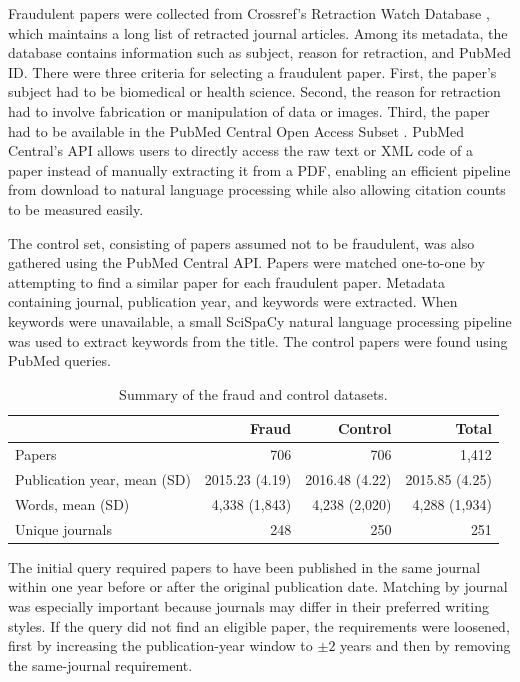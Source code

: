 \documentclass[11pt,letterpaper]{article}
\begin{document}
Fraudulent papers were collected from Crossref's Retraction Watch Database \cite{retraction_watch_database}, which maintains a long list of retracted journal articles. Among its metadata, the database contains information such as subject, reason for retraction, and PubMed ID. There were three criteria for selecting a fraudulent paper. First, the paper's subject had to be biomedical or health science. Second, the reason for retraction had to involve fabrication or manipulation of data or images. Third, the paper had to be available in the PubMed Central Open Access Subset \cite{pmc_oa_subset}. PubMed Central's API allows users to directly access the raw text or XML code of a paper instead of manually extracting it from a PDF, enabling an efficient pipeline from download to natural language processing while also allowing citation counts to be measured easily.

The control set, consisting of papers assumed not to be fraudulent, was also gathered using the PubMed Central API. Papers were matched one-to-one by attempting to find a similar paper for each fraudulent paper. Metadata containing journal, publication year, and keywords were extracted. When keywords were unavailable, a small SciSpaCy natural language processing pipeline \cite{neumann2019scispacy} was used to extract keywords from the title. The control papers were found using PubMed queries.
\begin{table}[!t]
\centering
\small
\caption{Summary of the fraud and control datasets.}
\label{tab:dataset-summary}
\begin{tabular}{lrrr}
\toprule
 & Fraud & Control & Total \\
\midrule
Papers & 706 & 706 & 1,412 \\
Publication year, mean (SD) & 2015.23 (4.19) & 2016.48 (4.22) & 2015.85 (4.25) \\
Words, mean (SD) & 4,338 (1,843) & 4,238 (2,020) & 4,288 (1,934) \\
Unique journals & 248 & 250 & 251 \\
\bottomrule
\end{tabular}
\end{table}
The initial query required papers to have been published in the same journal within one year before or after the original publication date. Matching by journal was especially important because journals may differ in their preferred writing styles. If the query did not find an eligible paper, the requirements were loosened, first by increasing the publication-year window to $\pm 2$ years and then by removing the same-journal requirement.
\end{document}
